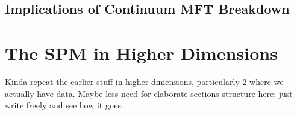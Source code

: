 \subsection{Implications of Continuum MFT Breakdown}

\section{The SPM in Higher Dimensions}
Kinda repeat the earlier stuff in higher dimensions, particularly 2 where we actually have data. Maybe less need for elaborate sections structure here; just write freely and see how it goes.

